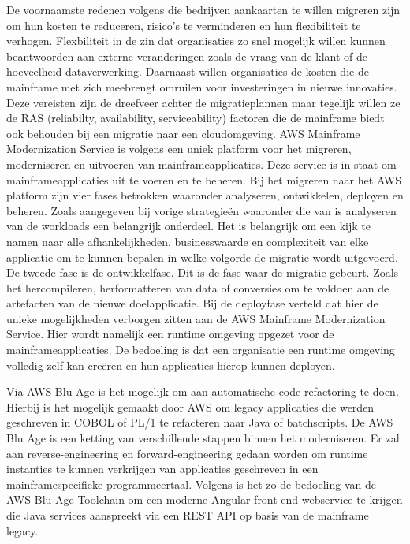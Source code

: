 De voornaamste redenen volgens \citeauthor{Valence2021} die bedrijven aankaarten te willen migreren zijn om hun kosten te reduceren, risico's te verminderen en hun flexibiliteit te verhogen. Flexbiliteit in de zin dat organisaties zo snel mogelijk willen kunnen beantwoorden aan externe veranderingen zoals de vraag van de klant of de hoeveelheid dataverwerking. Daarnaast willen organisaties de kosten die de mainframe met zich meebrengt omruilen voor investeringen in nieuwe innovaties. Deze vereisten zijn de dreefveer achter de migratieplannen maar tegelijk willen ze de RAS (reliabilty, availability, serviceability) factoren die de mainframe biedt ook behouden bij een migratie naar een cloudomgeving. AWS Mainframe Modernization Service is volgens \citeauthor{Valence2021} een uniek platform voor het migreren, moderniseren en uitvoeren van mainframeapplicaties. Deze service is in staat om mainframeapplicaties uit te voeren en te beheren. Bij het migreren naar het AWS platform zijn vier fases betrokken waaronder analyseren, ontwikkelen, deployen en beheren. Zoals aangegeven bij vorige strategieën waaronder die van \citeauthor{Marble2017} is analyseren van de workloads een belangrijk onderdeel. Het is belangrijk om een kijk te namen naar alle afhankelijkheden, businesswaarde en complexiteit van elke applicatie om te kunnen bepalen in welke volgorde de migratie wordt uitgevoerd. De tweede fase is de ontwikkelfase. Dit is de fase waar de migratie gebeurt. Zoals het hercompileren, herformatteren van data of conversies om te voldoen aan de artefacten van de nieuwe doelapplicatie. Bij de deployfase verteld \citeauthor{Valence2021} dat hier de unieke mogelijkheden verborgen zitten aan de AWS Mainframe Modernization Service. Hier wordt namelijk een runtime omgeving opgezet voor de mainframeapplicaties. De bedoeling is dat een organisatie een runtime omgeving volledig zelf kan creëren en hun applicaties hierop kunnen deployen. 

Via AWS Blu Age is het mogelijk om aan automatische code refactoring te doen. Hierbij is het mogelijk gemaakt door AWS om legacy applicaties die werden geschreven in COBOL of PL/1 te refacteren naar Java of batchscripts. De AWS Blu Age is een ketting van verschillende stappen binnen het moderniseren. Er zal aan reverse-engineering en forward-engineering gedaan worden om runtime instanties te kunnen verkrijgen van applicaties geschreven in een mainframespecifieke programmeertaal. Volgens \citeauthor{Valence2021} is het zo de bedoeling van de AWS Blu Age Toolchain om een moderne Angular front-end webservice te krijgen die Java services aanspreekt via een REST API op basis van de mainframe legacy.  

